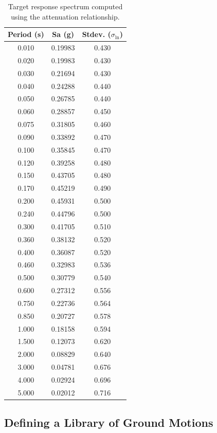 \documentclass[11pt]{article}
\begin{document}
\begin{table}[tbp]
\centering
\begin{tabular}{ccc}
\hline\hline
\textbf{Period (s)} & \textbf{Sa (g)} & \textbf{Stdev.} ($\sigma_{\ln}$) \\
\hline
0.010 & 0.19983 & 0.430 \\
0.020 & 0.19983 & 0.430 \\
0.030 & 0.21694 & 0.430 \\
0.040 & 0.24288 & 0.440 \\
0.050 & 0.26785 & 0.440 \\
0.060 & 0.28857 & 0.450 \\
0.075 & 0.31805 & 0.460 \\
0.090 & 0.33892 & 0.470 \\
0.100 & 0.35845 & 0.470 \\
0.120 & 0.39258 & 0.480 \\
0.150 & 0.43705 & 0.480 \\
0.170 & 0.45219 & 0.490 \\
0.200 & 0.45931 & 0.500 \\
0.240 & 0.44796 & 0.500 \\
0.300 & 0.41705 & 0.510 \\
0.360 & 0.38132 & 0.520 \\
0.400 & 0.36087 & 0.520 \\
0.460 & 0.32983 & 0.536 \\
0.500 & 0.30779 & 0.540 \\
0.600 & 0.27312 & 0.556 \\
0.750 & 0.22736 & 0.564 \\
0.850 & 0.20727 & 0.578 \\
1.000 & 0.18158 & 0.594 \\
1.500 & 0.12073 & 0.620 \\
2.000 & 0.08829 & 0.640 \\
3.000 & 0.04781 & 0.676 \\
4.000 & 0.02924 & 0.696 \\
5.000 & 0.02012 & 0.716 \\
\hline\hline
\end{tabular}
\caption{Target response spectrum computed using the \citet{abrahamson:97} attenuation
relationship.}
\label{tab:target}
\end{table}

\subsection{Defining a Library of Ground Motions}\label{sec:example:library}
\end{document}
